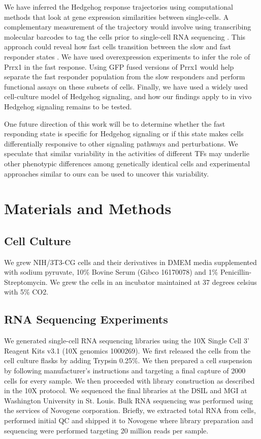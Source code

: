 We have inferred the Hedgehog response trajectories using computational methods that look at gene expression similarities between single-cells. A complementary measurement of the trajectory would involve using transcribing molecular barcodes to tag the cells prior to single-cell RNA sequencing \cite{Kong2020-ox}. This approach could reveal how fast cells transition between the slow and fast responder states \cite{Hormoz2016-wo,Stumpf2017-ne,Larsson2021-ub}. We have used overexpression experiments to infer the role of Prrx1 in the fast response. Using GFP fused versions of Prrx1 would help separate the fast responder population from the slow responders and perform functional assays on these subsets of cells. Finally, we have used a widely used cell-culture model of Hedgehog signaling, and how our findings apply to in vivo Hedgehog signaling remains to be tested. 

One future direction of this work will be to determine whether the fast responding state is specific for Hedgehog signaling or if this state makes cells differentially responsive to other signaling pathways and perturbations. We speculate that similar variability in the activities of different TFs may underlie other phenotypic differences among genetically identical cells and experimental approaches similar to ours can be used to uncover this variability.

\section{Materials and Methods}

\subsection{Cell Culture}
We grew NIH/3T3-CG cells and their derivatives in DMEM media supplemented with sodium pyruvate, 10\% Bovine Serum (Gibco 16170078) and 1\% Penicillin-Streptomycin. We grew the cells in an incubator maintained at 37 degrees celsius with 5\% CO2.

\subsection{RNA Sequencing Experiments}
We generated single-cell RNA sequencing libraries using the 10X Single Cell 3’ Reagent Kits v3.1 (10X genomics 1000269). We first released the cells from the cell culture flasks by adding Trypsin 0.25\%. We then prepared a cell suspension by following manufacturer’s instructions and targeting a final capture of 2000 cells for every sample. We then proceeded with library construction as described in the 10X protocol. We sequenced the final libraries at the DSIL and MGI at Washington University in St. Louis. Bulk RNA sequencing was performed using the services of Novogene corporation. Briefly, we extracted total RNA from cells, performed initial QC and shipped it to Novogene where library preparation and sequencing were performed targeting 20 million reads per sample. 

